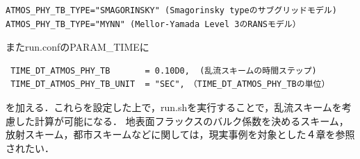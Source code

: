 \begin{verbatim}
ATMOS_PHY_TB_TYPE="SMAGORINSKY" (Smagorinsky typeのサブグリッドモデル)
ATMOS_PHY_TB_TYPE="MYNN" (Mellor-Yamada Level 3のRANSモデル）
\end{verbatim}

またrun.confのPARAM\_TIMEに

\begin{verbatim}
 TIME_DT_ATMOS_PHY_TB       = 0.10D0,  (乱流スキームの時間ステップ)
 TIME_DT_ATMOS_PHY_TB_UNIT  = "SEC",　（TIME_DT_ATMOS_PHY_TBの単位）
\end{verbatim}

を加える．これらを設定した上で，run.shを実行することで，乱流スキームを考慮した計算が可能になる．
地表面フラックスのバルク係数を決めるスキーム，放射スキーム，都市スキームなどに関しては，現実事例を対象とした４章を参照されたい．


%
%
%
%

